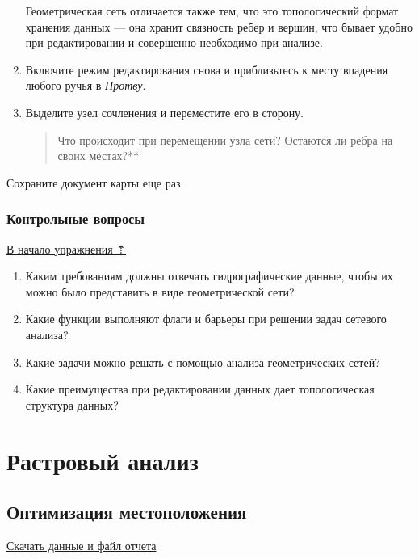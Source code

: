 \documentclass[12pt,]{book}
\begin{document}
\begin{enumerate}
  Геометрическая сеть отличается также тем, что это топологический формат хранения данных --- она хранит связность ребер и вершин, что бывает удобно при редактировании и совершенно необходимо при анализе.
\item
  Включите режим редактирования снова и приблизьтесь к месту впадения любого ручья в \emph{Протву}.
\item
  Выделите узел сочленения и переместите его в сторону.

  \begin{quote}
  Что происходит при перемещении узла сети? Остаются ли ребра на своих местах?**
  \end{quote}
\end{enumerate}

Сохраните документ карты еще раз.

\hypertarget{network-hydro-questions}{%
\section{Контрольные вопросы}\label{network-hydro-questions}}

\protect\hyperlink{network-hydro}{В начало упражнения ⇡}

\begin{enumerate}
\def\labelenumi{\arabic{enumi}.}
\item
  Каким требованиям должны отвечать гидрографические данные, чтобы их можно было представить в виде геометрической сети?
\item
  Какие функции выполняют флаги и барьеры при решении задач сетевого анализа?
\item
  Какие задачи можно решать с помощью анализа геометрических сетей?
\item
  Какие преимущества при редактировании данных дает топологическая структура данных?
\end{enumerate}

\hypertarget{part---2}{%
\part{Растровый анализ}\label{part---2}}

\hypertarget{weighted-overlay}{%
\chapter{Оптимизация местоположения}\label{weighted-overlay}}

\href{http://autolab.geogr.msu.ru/gis/data/Ex14.zip}{Скачать данные и файл отчета}
\end{document}
